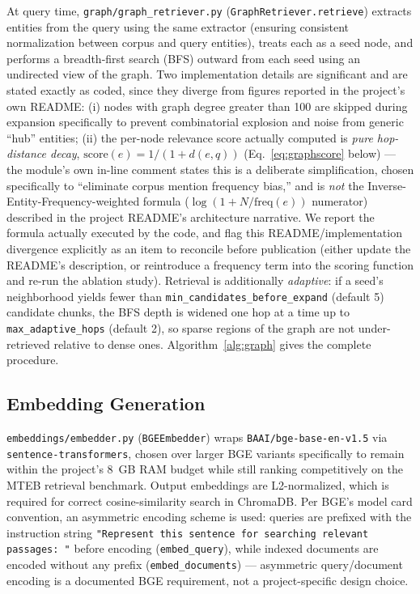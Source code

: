 \documentclass[conference]{IEEEtran}
\begin{document}
At query time, \texttt{graph/graph\_retriever.py} (\texttt{GraphRetriever.retrieve}) extracts entities from the query using the same extractor (ensuring consistent normalization between corpus and query entities), treats each as a seed node, and performs a breadth-first search (BFS) outward from each seed using an undirected view of the graph. Two implementation details are significant and are stated exactly as coded, since they diverge from figures reported in the project's own README: (i) nodes with graph degree greater than 100 are skipped during expansion specifically to prevent combinatorial explosion and noise from generic ``hub'' entities; (ii) the per-node relevance score actually computed is \emph{pure hop-distance decay}, $\text{score}(e) = 1/(1+d(e,q))$ (Eq.~\ref{eq:graphscore} below) — the module's own in-line comment states this is a deliberate simplification, chosen specifically to ``eliminate corpus mention frequency bias,'' and is \emph{not} the Inverse-Entity-Frequency-weighted formula ($\log(1+N/\text{freq}(e))$ numerator) described in the project README's architecture narrative. We report the formula actually executed by the code, and flag this README/implementation divergence explicitly as an item to reconcile before publication (either update the README's description, or reintroduce a frequency term into the scoring function and re-run the ablation study). Retrieval is additionally \emph{adaptive}: if a seed's neighborhood yields fewer than \texttt{min\_candidates\_before\_expand} (default 5) candidate chunks, the BFS depth is widened one hop at a time up to \texttt{max\_adaptive\_hops} (default 2), so sparse regions of the graph are not under-retrieved relative to dense ones. Algorithm~\ref{alg:graph} gives the complete procedure.

\subsection{Embedding Generation}
\texttt{embeddings/embedder.py} (\texttt{BGEEmbedder}) wraps \texttt{BAAI/bge-base-en-v1.5} via \texttt{sentence-transformers}, chosen over larger BGE variants specifically to remain within the project's 8~GB RAM budget while still ranking competitively on the MTEB retrieval benchmark. Output embeddings are L2-normalized, which is required for correct cosine-similarity search in ChromaDB. Per BGE's model card convention, an asymmetric encoding scheme is used: queries are prefixed with the instruction string \texttt{"Represent this sentence for searching relevant passages: "} before encoding (\texttt{embed\_query}), while indexed documents are encoded without any prefix (\texttt{embed\_documents}) — asymmetric query/document encoding is a documented BGE requirement, not a project-specific design choice.
\end{document}
